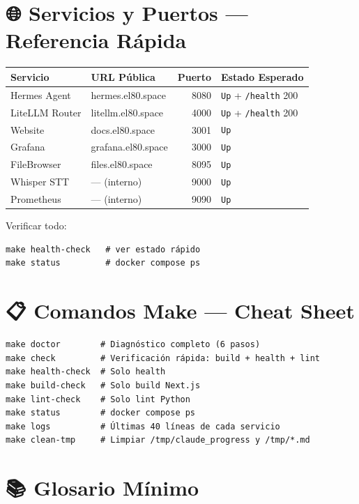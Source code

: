 \documentclass[11pt,a4paper,spanish]{article}
\begin{document}
\section{🌐 Servicios y Puertos — Referencia Rápida}

\begin{center}
\small
\begin{tabular}{|l|l|r|l|}
\hline
\textbf{Servicio} & \textbf{URL Pública} & \textbf{Puerto} & \textbf{Estado Esperado} \\
\hline
Hermes Agent & hermes.el80.space & 8080 & \texttt{Up} + \texttt{/health} 200 \\
LiteLLM Router & litellm.el80.space & 4000 & \texttt{Up} + \texttt{/health} 200 \\
Website & docs.el80.space & 3001 & \texttt{Up} \\
Grafana & grafana.el80.space & 3000 & \texttt{Up} \\
FileBrowser & files.el80.space & 8095 & \texttt{Up} \\
Whisper STT & — (interno) & 9000 & \texttt{Up} \\
Prometheus & — (interno) & 9090 & \texttt{Up} \\
\hline
\end{tabular}
\end{center}

\vspace{0.3cm}

Verificar todo:
\begin{lstlisting}
make health-check   # ver estado rápido
make status         # docker compose ps
\end{lstlisting}

\section{📋 Comandos Make — Cheat Sheet}

\begin{lstlisting}
make doctor        # Diagnóstico completo (6 pasos)
make check         # Verificación rápida: build + health + lint
make health-check  # Solo health
make build-check   # Solo build Next.js
make lint-check    # Solo lint Python
make status        # docker compose ps
make logs          # Últimas 40 líneas de cada servicio
make clean-tmp     # Limpiar /tmp/claude_progress y /tmp/*.md
\end{lstlisting}

\section{📚 Glosario Mínimo}
\end{document}
